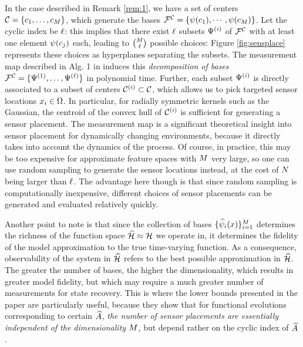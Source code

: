In the case described in Remark \ref{rem:1}, we have a set of centers $\mathcal{C}=\{c_1,\dots,c_{M}\}$, which generate the bases $\mathcal{F}^{\mathcal{C}} = \{\psi(c_1), \cdots , \psi(c_{M})\}$. Let the cyclic index be $\ell$: this implies that there exist $\ell$ subsets $\Psi^{(i)}$ of $\mathcal{F}^{\mathcal{C}}$ with at least one element $\psi(c_j)$ each, leading to $\binom{M}{\ell}$ possible choices: Figure \ref{fig:sensplace} represents these choices as hyperplanes separating the subsets. 
The measurement map described in Alg. 1 in \cite{Kingravi16_NIPS} induces this \emph{decomposition of bases} $\mathcal{F}^{\mathcal{C}} = \{\Psi^{(1)},\dots,\Psi^{(\ell)}\}$ in polynomial time. Further, each subset $\Psi^{(i)}$ is directly associated to a subset of centers $\mathcal{C}^{(i)}\subset\mathcal{C}$, which allows us to pick targeted sensor locations $x_i\in\Omega$. In particular, for radially symmetric kernels such as the Gaussian, the centroid of the convex hull of $\mathcal{C}^{(i)}$ is sufficient for generating a sensor placement. The measurement map is a significant theoretical insight into sensor placement for dynamically changing environments, because it directly takes into account the dynamics of the process. Of course, in practice, this may be too expensive for approximate feature spaces with $M$ very large, so one can use random sampling to generate the sensor locations instead, at the cost of $N$ being larger than $\ell$. The advantage here though is that since random sampling is computationally inexpensive, different choices of sensor placements can be generated and evaluated relatively quickly.

Another point to note is that since the collection of bases $\{\widehat{\psi}_i(x)\}_{i=1}^{M}$ determines the richness of the function space $\widehat{\mathcal{H}}\approx\mathcal{H}$ we operate in, it determines the fidelity of the model approximation to the true time-varying function. As a consequence, observability of the system in $\widehat{\mathcal{H}}$ refers to the best possible approximation in $\widehat{\mathcal{H}}$. The greater the number of bases, the higher the dimensionality, which results in greater model fidelity, but which may require a much greater number of measurements for state recovery. This is where the lower bounds presented in the paper are particularly useful, because they show that for functional evolutions corresponding to certain $\widehat{A}$, \emph{the number of sensor placements are essentially independent of the dimensionality $M$}, but depend rather on the cyclic index of $\widehat{A}$.

